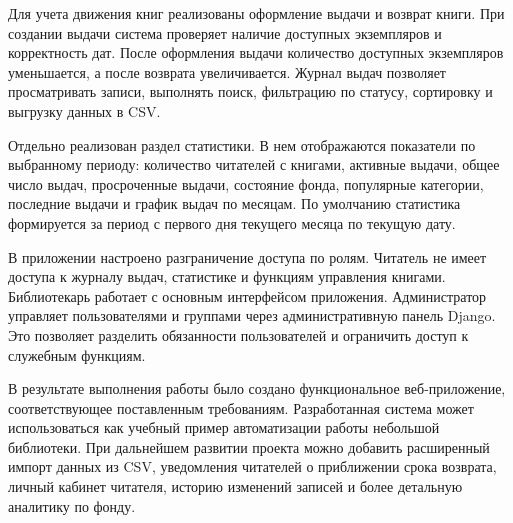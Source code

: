 Для учета движения книг реализованы оформление выдачи и возврат книги. При создании выдачи система проверяет наличие доступных экземпляров и корректность дат. После оформления выдачи количество доступных экземпляров уменьшается, а после возврата увеличивается. Журнал выдач позволяет просматривать записи, выполнять поиск, фильтрацию по статусу, сортировку и выгрузку данных в CSV.

Отдельно реализован раздел статистики. В нем отображаются показатели по выбранному периоду: количество читателей с книгами, активные выдачи, общее число выдач, просроченные выдачи, состояние фонда, популярные категории, последние выдачи и график выдач по месяцам. По умолчанию статистика формируется за период с первого дня текущего месяца по текущую дату.

В приложении настроено разграничение доступа по ролям. Читатель не имеет доступа к журналу выдач, статистике и функциям управления книгами. Библиотекарь работает с основным интерфейсом приложения. Администратор управляет пользователями и группами через административную панель Django. Это позволяет разделить обязанности пользователей и ограничить доступ к служебным функциям.

В результате выполнения работы было создано функциональное веб-приложение, соответствующее поставленным требованиям. Разработанная система может использоваться как учебный пример автоматизации работы небольшой библиотеки. При дальнейшем развитии проекта можно добавить расширенный импорт данных из CSV, уведомления читателей о приближении срока возврата, личный кабинет читателя, историю изменений записей и более детальную аналитику по фонду.